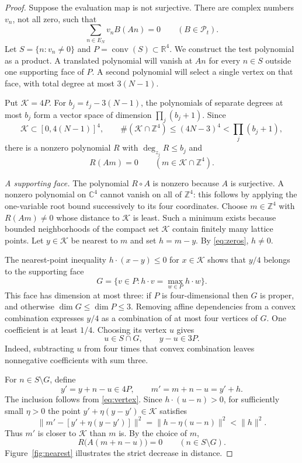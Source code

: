 \documentclass[11pt,a4paper]{amsart}
\theoremstyle{remark}
\newcommand{\Z}{\mathbb Z}
\newcommand{\C}{\mathbb C}
\newcommand{\R}{\mathbb R}
\newcommand{\cP}{\mathcal P}
\newcommand{\cK}{\mathcal K}
\DeclareMathOperator{\conv}{conv}
\numberwithin{equation}{section}
\begin{document}
\begin{proof}
Suppose the evaluation map is not surjective. There are complex
numbers $v_n$, not all zero, such that
\begin{equation}\label{eq:moments}
 \sum_{n\in E_N}v_nB(An)=0\qquad(B\in\cP_t).
\end{equation}
Let $S=\{n:v_n\ne0\}$ and $P=\conv(S)\subset\R^4$.
We construct the test polynomial as a product. A translated
polynomial will vanish at $An$ for every $n\in S$ outside one
supporting face of $P$. A second polynomial will select a single
vertex on that face, with total degree at most $3(N-1)$.

Put $\cK=4P$. For $b_j=t_j-3(N-1)$, the polynomials of separate degrees
at most $b_j$ form a vector space of dimension $\prod_j(b_j+1)$.
Since
\[
 \cK\subset[0,4(N-1)]^4,\qquad
 \#(\cK\cap\Z^4)\le(4N-3)^4<\prod_j(b_j+1),
\]
there is a nonzero polynomial $R$ with $\deg_{z_j}R\le b_j$ and
\begin{equation}\label{eq:zeros}
 R(Am)=0\qquad(m\in\cK\cap\Z^4).
\end{equation}

\smallskip\noindent
\emph{A supporting face.}
The polynomial $R\circ A$ is nonzero because $A$ is surjective.
A nonzero polynomial on $\C^4$ cannot vanish on all of $\Z^4$:
this follows by applying the one-variable root bound successively
to its four coordinates. Choose $m\in\Z^4$ with $R(Am)\ne0$ whose
distance to $\cK$ is least. Such a minimum exists because bounded
neighborhoods of the compact set $\cK$ contain finitely many lattice
points. Let $y\in\cK$ be nearest to $m$ and set $h=m-y$.
By \eqref{eq:zeros}, $h\ne0$.

The nearest-point inequality
$h\cdot(x-y)\le0$ for $x\in\cK$ shows that $y/4$ belongs to
the supporting face
\[
 G=\{v\in P:h\cdot v=\max_{w\in P}h\cdot w\}.
\]
This face has dimension at most three: if $P$ is four-dimensional
then $G$ is proper, and otherwise $\dim G\le\dim P\le3$.
Removing affine dependencies from a convex combination expresses
$y/4$ as a combination of at most four vertices of $G$. One
coefficient is at least $1/4$. Choosing its vertex $u$ gives
\begin{equation}\label{eq:vertex}
 u\in S\cap G,\qquad y-u\in3P.
\end{equation}
Indeed, subtracting $u$ from four times that convex combination
leaves nonnegative coefficients with sum three.

For $n\in S\setminus G$, define
\[
 y'=y+n-u\in4P,\qquad m'=m+n-u=y'+h.
\]
The inclusion follows from \eqref{eq:vertex}. Since
$h\cdot(u-n)>0$, for sufficiently small $\eta>0$ the point
$y'+\eta(y-y')\in\cK$ satisfies
\begin{equation}\label{eq:distance}
 \bigl\|m'-[y'+\eta(y-y')]\bigr\|^2
 =\|h-\eta(u-n)\|^2<\|h\|^2.
\end{equation}
Thus $m'$ is closer to $\cK$ than $m$ is. By the choice of $m$,
\begin{equation}\label{eq:offface}
 R\bigl(A(m+n-u)\bigr)=0\qquad(n\in S\setminus G).
\end{equation}
Figure~\ref{fig:nearest} illustrates the strict decrease in distance.


\end{proof}
\end{document}
